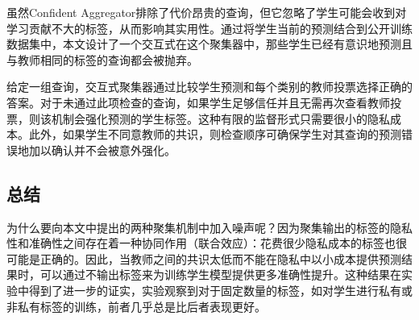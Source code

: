 \documentclass[a4paper]{article}
\begin{document}
虽然Confident Aggregator排除了代价昂贵的查询，但它忽略了学生可能会收到对学习贡献不大的标签，从而影响其实用性。通过将学生当前的预测结合到公开训练数据集中，本文设计了一个交互式在这个聚集器中，那些学生已经有意识地预测且与教师相同的标签的查询都会被抛弃。

给定一组查询，交互式聚集器通过比较学生预测和每个类别的教师投票选择正确的答案。对于未通过此项检查的查询，如果学生足够信任并且无需再次查看教师投票，则该机制会强化预测的学生标签。这种有限的监督形式只需要很小的隐私成本。此外，如果学生不同意教师的共识，则检查顺序可确保学生对其查询的预测错误地加以确认并不会被意外强化。


\subsection{总结}
为什么要向本文中提出的两种聚集机制中加入噪声呢？因为聚集输出的标签的隐私性和准确性之间存在着一种协同作用（联合效应）：花费很少隐私成本的标签也很可能是正确的。因此，当教师之间的共识太低而不能在隐私中以小成本提供预测结果时，可以通过不输出标签来为训练学生模型提供更多准确性提升。这种结果在实验中得到了进一步的证实，实验观察到对于固定数量的标签，如对学生进行私有或非私有标签的训练，前者几乎总是比后者表现更好。



\end{document}
